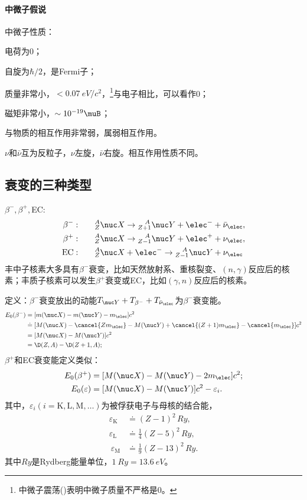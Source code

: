 \paragraph{中微子假说}中微子性质：
\begin{compactenum}
	\item 电荷为0；
	\item 自旋为$\hbar/2$，是Fermi子；
	\item 质量非常小，\href{https://www.sciencedirect.com/topics/chemistry/electron-neutrino}{$<\SI{0.07}{eV}/c^2$}，\footnote{中微子震荡()表明中微子质量不严格是0。}与电子相比，可以看作0；
	\item 磁矩非常小，\href{https://arxiv.org/ftp/arxiv/papers/1506/1506.01284.pdf}{$\sim 10^{-19}\muB$}；
	\item 与物质的相互作用非常弱，属弱相互作用。
\end{compactenum}
$\nu$和$\bar\nu$互为反粒子，$\nu$左旋，$\bar\nu$右旋。相互作用性质不同。

\subsection{\textbeta 衰变的三种类型}

$\beta^-,\beta^+,$EC:
\begin{align}
	\beta^-:&\qquad{^A_Z\nuc X} \to {^{\quad\!A}_{Z+1}\nuc Y} + \elec^- + \bar\nu_\elec,\\
	\beta^+:&\qquad{^A_Z\nuc X} \to {^{\quad\!A}_{Z-1}\nuc Y} + \elec^+ + \nu_\elec,\\
	\mathrm{EC}:&\qquad{^A_Z\nuc X} + \elec^- \to {^{\quad\!A}_{Z-1}\nuc Y} + \nu_\elec
\end{align}
丰中子核素大多具有$\beta^-$衰变，比如天然放射系、重核裂变、$(n,\gamma)$反应后的核素；丰质子核素可以发生$\beta^+$衰变或EC，比如$(\gamma,n)$反应后的核素。

定义：$\beta^-$衰变放出的动能$T_{\nuc Y}+T_{\beta^-}+T_{\bar\nu_\elec}$为$\beta^-$衰变能。
\begin{align}\notag
	E_0(\beta^-)&=[m(\nuc X)-m(\nuc Y)-m_\elec]c^2\\\notag
	&\doteq[M(\nuc X)-\cancel{Zm_\elec}-M(\nuc Y)+\cancel{(Z+1)m_\elec}-\cancel{m_\elec}]c^2\\
	&=[M(\nuc X)-M(\nuc Y)]c^2\\\notag
	&=\D(Z,A)-\D(Z+1,A);
\end{align}
$\beta^+$和EC衰变能定义类似：
\begin{align}
	E_0(\beta^+)&=[M(\nuc X)-M(\nuc Y)-2m_\elec]c^2;\\
	E_0(\varepsilon)&=[M(\nuc X)-M(\nuc Y)]c^2-\varepsilon_i.
\end{align}
其中，$\varepsilon_i(i=\mathrm{K,L,M,}\ldots)$为被俘获电子与母核的结合能，
\begin{align*}
	\varepsilon_{\mathrm K}&\doteq(Z-1)^2\,\si{Ry},\\
	\varepsilon_{\mathrm L}&\doteq\frac14(Z-5)^2\,\si{Ry},\\\
	\varepsilon_{\mathrm M}&\doteq\frac19(Z-13)^2\,\si{Ry}.
\end{align*}
其中$\si{Ry}$是Rydberg能量单位，$\SI{1}{Ry}=\SI{13.6}{eV}$。

